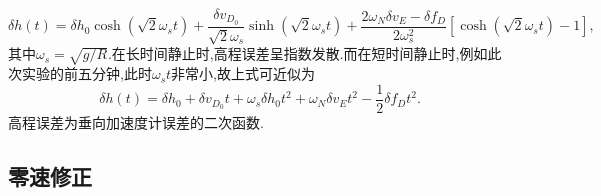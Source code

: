 \documentclass[10pt,a4paper]{ctexart}
\begin{document}
\begin{equation}\label{eq:6.1}
    \delta h(t) =\delta h_0 \cosh (\sqrt{2} \omega_s t) + \frac{\delta v_{D_0}}{\sqrt{2}\omega_s} \sinh (\sqrt{2}\omega_s t) +
    \frac{2\omega_N \delta v_E -\delta f_D}{2\omega_s^2} \left[ \cosh(\sqrt{2}\omega_s t) - 1 \right] ,
\end{equation}
其中$\omega_s=\sqrt{g/R}$.在长时间静止时,高程误差呈指数发散.而在短时间静止时,例如此次实验的前五分钟,此时$\omega_s t$非常小,故上式可近似为
\begin{equation}\label{eq:6.2}
    \delta h(t) =\delta h_0 +\delta v_{D_0}t + \omega_s \delta h_0 t^2 +\omega_N \delta v_E t^2 - \frac{1}{2}\delta f_D t^2.
\end{equation}
高程误差为垂向加速度计误差的二次函数.

\subsection{零速修正}
\end{document}
